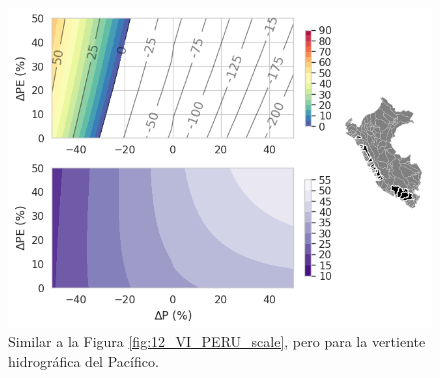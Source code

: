 \begin{figure}[ht!]
	\includegraphics[scale=.85]{Images/12_VI_Nivel_scale_Pacific.png}
	\centering
	\caption{Similar a la Figura \ref{fig:12_VI_PERU_scale}, pero para la vertiente hidrográfica del Pacífico.}
	\label{fig:12_VI_Nivel_scale_Pacific}
\end{figure}

